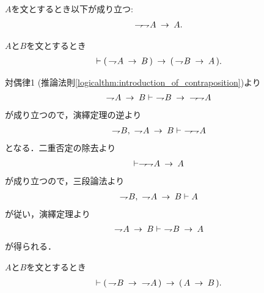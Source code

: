 	\begin{screen}
		\begin{logicalaxm}[二重否定の除去]
		\label{logicalaxm:elimination_of_double_negation}
			$A$を文とするとき以下が成り立つ:
			\begin{align}
				\negation \negation A \rarrow A.
			\end{align}
		\end{logicalaxm}
	\end{screen}
	
	\begin{screen}
		\begin{logicalthm}[対偶律3]\label{logicalthm:contraposition_3}
			$A$と$B$を文とするとき
			\begin{align}
				\vdash (\, \negation A \rarrow B\, )
				\rarrow (\, \negation B \rarrow A\, ).
			\end{align}
		\end{logicalthm}
	\end{screen}
	
	\begin{sketch}
		対偶律1 (推論法則\ref{logicalthm:introduction_of_contraposition})より
		\begin{align}
			\negation A \rarrow B \vdash\ \negation B \rarrow\ \negation \negation A
		\end{align}
		が成り立つので，演繹定理の逆より
		\begin{align}
			\negation B,\ \negation A \rarrow B \vdash\ \negation \negation A
		\end{align}
		となる．二重否定の除去より
		\begin{align}
			\vdash \negation \negation A \rarrow A
		\end{align}
		が成り立つので，三段論法より
		\begin{align}
			\negation B,\ \negation A \rarrow B \vdash A
		\end{align}
		が従い，演繹定理より
		\begin{align}
			\negation A \rarrow B \vdash\ \negation B \rarrow A
		\end{align}
		が得られる．
		\QED
	\end{sketch}
	
	\begin{screen}
		\begin{logicalthm}[対偶律4]
		\label{logicalthm:proof_by_contraposition}
			$A$と$B$を文とするとき
			\begin{align}
				\vdash (\, \negation B \rarrow\ \negation A\, )
				\rarrow (\, A \rarrow B\, ).
			\end{align}
		\end{logicalthm}
	\end{screen}
	
